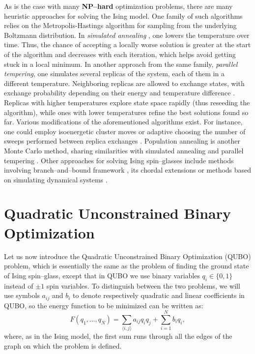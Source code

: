 As is the case with many \textbf{NP--hard} optimization problems, there are
many heuristic approaches for solving the Ising model. One family of such
algorithms relies on the Metropolis-Hastings \cite{beichl} algorithm for
sampling from the underlying Boltzmann distribution. In \emph{simulated
  annealing} \cite{cook, isakov}, one lowers the temperature over time. Thus, the
chance of accepting a locally worse solution is greater at the start of the
algorithm and decreases with each iteration, which helps avoid getting stuck in
a local minimum. In another approach from the same family, \emph{parallel
  tempering}, one simulates several replicas of the system, each of them in a
different temperature. Neighboring replicas are allowed to exchange states,
with exchange probability depending on their energy and temperature difference
\cite{swendsen}. Replicas with higher temperatures explore state space rapidly
(thus reseeding the algorithm), while ones with lower temperatures refine the
best solutions found so far. Various modifications of the aforementioned
algorithms exist. For instance, one could employ isoenergetic cluster moves
\cite{zhu} or adaptive choosing the number of sweeps performed between replica
exchanges \cite{bittner}. Population annealing is another Monte Carlo method,
sharing similarities with simulated annealing and parallel tempering
\cite{wang}. Other approaches for solving Ising spin--glasses include methods
involving branch--and--bound framework \cite{rendl}, its chordal extensions
\cite{baccari} or methods based on simulating dynamical systems \cite{sheldon}.

\section{Quadratic Unconstrained Binary Optimization}

Let us now introduce the Quadratic Unconstrained Binary Optimization (QUBO)
problem, which is essentially the same as the problem of finding the ground
state of Ising spin--glass, except that in QUBO we use binary variables $q_{i}
  \in \{0, 1\}$ instead of $\pm 1$ spin variables. To distinguish between the two
problems, we will use symbols $a_{ij}$ and $b_{i}$ to denote respectively
quadratic and linear coefficients in QUBO, so the energy function to be
minimized can be written as:
\begin{equation}
  \label{eq:qubo}
  F(q_1, \ldots, q_N) =  \sum_{\langle i, j \rangle} a_{ij} q_i q_j + \sum_{i=1}^N b_iq_i,
\end{equation}
where, as in the Ising model, the first sum runs through all the edges of the graph on which
the problem is defined.

